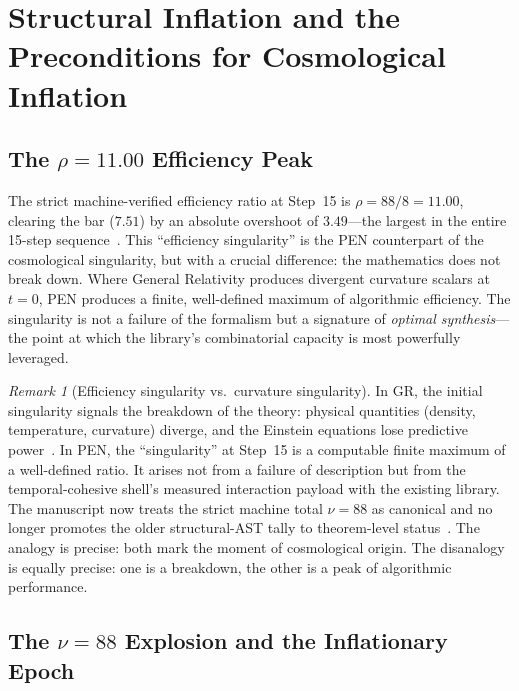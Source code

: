 \documentclass[11pt,a4paper]{article}
\theoremstyle{plain}
\theoremstyle{definition}
\theoremstyle{remark}
\newtheorem{remark}[theorem]{Remark}
\begin{document}
\section{Structural Inflation and the Preconditions for Cosmological Inflation}
\label{sec:inflation}

\subsection{\texorpdfstring{The $\rho = 11.00$ Efficiency Peak}{The rho = 11.00 Efficiency Peak}}
\label{sec:rho-spike}

The strict machine-verified efficiency ratio at Step~15 is $\rho = 88/8 = 11.00$, clearing the bar ($7.51$) by an absolute overshoot of $3.49$---the largest in the entire 15-step sequence~\cite{pen}.
This ``efficiency singularity'' is the PEN counterpart of the cosmological singularity, but with a crucial difference: the mathematics does not break down.
Where General Relativity produces divergent curvature scalars at $t = 0$, PEN produces a finite, well-defined maximum of algorithmic efficiency.
The singularity is not a failure of the formalism but a signature of \emph{optimal synthesis}---the point at which the library's combinatorial capacity is most powerfully leveraged.

\begin{remark}[Efficiency singularity vs.\ curvature singularity]
\label{rem:singularity-contrast}
In GR, the initial singularity signals the breakdown of the theory: physical quantities (density, temperature, curvature) diverge, and the Einstein equations lose predictive power~\cite{hawking-ellis,wald}.
In PEN, the ``singularity'' at Step~15 is a computable finite maximum of a well-defined ratio.
It arises not from a failure of description but from the temporal-cohesive shell's measured interaction payload with the existing library.
The manuscript now treats the strict machine total $\nu = 88$ as canonical and no longer promotes the older structural-AST tally to theorem-level status~\cite{pen}.
The analogy is precise: both mark the moment of cosmological origin.
The disanalogy is equally precise: one is a breakdown, the other is a peak of algorithmic performance.
\end{remark}

\subsection{\texorpdfstring{The $\nu = 88$ Explosion and the Inflationary Epoch}{The nu = 88 Explosion and the Inflationary Epoch}}
\label{sec:nu-explosion}
\end{document}

